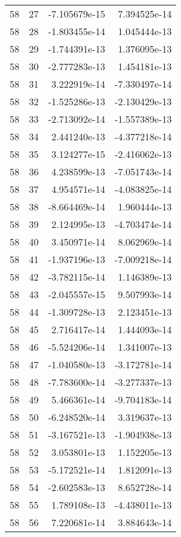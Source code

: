 \begin{tabular}{rrrr}
  58 &   27 & -7.105679e-15 &  7.394525e-14 \\
  58 &   28 & -1.803455e-14 &  1.045444e-13 \\
  58 &   29 & -1.744391e-13 &  1.376095e-13 \\
  58 &   30 & -2.777283e-13 &  1.454181e-13 \\
  58 &   31 &  3.222919e-14 & -7.330497e-14 \\
  58 &   32 & -1.525286e-13 & -2.130429e-13 \\
  58 &   33 & -2.713092e-14 & -1.557389e-13 \\
  58 &   34 &  2.441240e-13 & -4.377218e-14 \\
  58 &   35 &  3.124277e-15 & -2.416062e-13 \\
  58 &   36 &  4.238599e-13 & -7.051743e-14 \\
  58 &   37 &  4.954571e-14 & -4.083825e-14 \\
  58 &   38 & -8.664469e-14 &  1.960444e-13 \\
  58 &   39 &  2.124995e-13 & -4.703474e-14 \\
  58 &   40 &  3.450971e-14 &  8.062969e-14 \\
  58 &   41 & -1.937196e-13 & -7.009218e-14 \\
  58 &   42 & -3.782115e-14 &  1.146389e-13 \\
  58 &   43 & -2.045557e-15 &  9.507993e-14 \\
  58 &   44 & -1.309728e-13 &  2.123451e-13 \\
  58 &   45 &  2.716417e-14 &  1.444093e-14 \\
  58 &   46 & -5.524206e-14 &  1.341007e-13 \\
  58 &   47 & -1.040580e-13 & -3.172781e-14 \\
  58 &   48 & -7.783600e-14 & -3.277337e-13 \\
  58 &   49 &  5.466361e-14 & -9.704183e-14 \\
  58 &   50 & -6.248520e-14 &  3.319637e-13 \\
  58 &   51 & -3.167521e-13 & -1.904938e-13 \\
  58 &   52 &  3.053801e-13 &  1.152205e-13 \\
  58 &   53 & -5.172521e-14 &  1.812091e-13 \\
  58 &   54 & -2.602583e-13 &  8.652728e-14 \\
  58 &   55 &  1.789108e-13 & -4.438011e-13 \\
  58 &   56 &  7.220681e-14 &  3.884643e-14 \\

\end{tabular}
